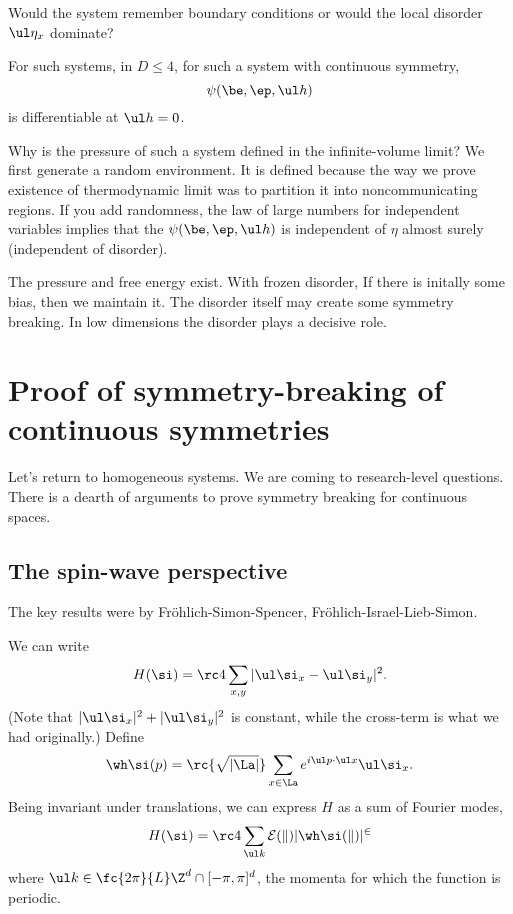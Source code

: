 Would the system remember boundary conditions or would the local disorder $\ul \eta_x$ dominate?

\begin{thm}
For such systems, in $D\le 4$, for such a system with continuous symmetry, 
\[
\psi(\be, \ep, \ul h) 
\]
is differentiable at $\ul h=0$.
\end{thm}
Why is the pressure of such a system defined in the infinite-volume limit? We first generate a random environment. 
It is defined because the way we prove existence of thermodynamic limit was to partition it into noncommunicating regions. If you add randomness, %
the law of large numbers for independent variables implies that the $\psi(\be, \ep, \ul h)$ is independent of $\eta$ almost surely (independent of disorder). 

The pressure and free energy exist. With frozen disorder, 
If there is initally some bias, then we maintain it. The disorder itself may create some symmetry breaking. In low dimensions the disorder plays a decisive role.

\section{Proof of symmetry-breaking of continuous symmetries
}

Let's return to homogeneous systems. We are coming to research-level questions. There is a dearth of arguments to prove symmetry breaking for continuous spaces. 

\subsection{The spin-wave perspective}

The key results were by Fr\"ohlich-Simon-Spencer, Fr\"ohlich-Israel-Lieb-Simon.

We can write 
\[
H(\si) = \rc 4 \sum_{x,y} |\ul \si_x - \ul \si_y|^2.
\]
(Note that $|\ul\si_x|^2 + |\ul \si_y|^2$ is constant, while the cross-term is what we had originally.)
Define
\[
\wh \si (p) = \rc{\sqrt{|\La|}} \sum_{x\in \La} e^{i\ul p \cdot \ul x} \ul \si_x.
\]
Being invariant under translations, we can express $H$ as a sum of Fourier modes,
\[
H(\si) = \rc 4\sum_{\ul k} \cal E(k) |\wh \si(k)|^2
\]
where $\ul k \in \fc{2\pi}{L}\Z^d \cap [-\pi, \pi]^d$,
the momenta for which the function is periodic.

